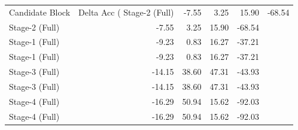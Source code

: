 \begin{tabular}{lrrrr}
\toprule
Candidate Block & Delta Acc (%
\midrule
Stage-2 (Full) & -7.55 & 3.25 & 15.90 & -68.54 \\
Stage-2 (Full) & -7.55 & 3.25 & 15.90 & -68.54 \\
Stage-1 (Full) & -9.23 & 0.83 & 16.27 & -37.21 \\
Stage-1 (Full) & -9.23 & 0.83 & 16.27 & -37.21 \\
Stage-3 (Full) & -14.15 & 38.60 & 47.31 & -43.93 \\
Stage-3 (Full) & -14.15 & 38.60 & 47.31 & -43.93 \\
Stage-4 (Full) & -16.29 & 50.94 & 15.62 & -92.03 \\
Stage-4 (Full) & -16.29 & 50.94 & 15.62 & -92.03 \\
\bottomrule
\end{tabular}
